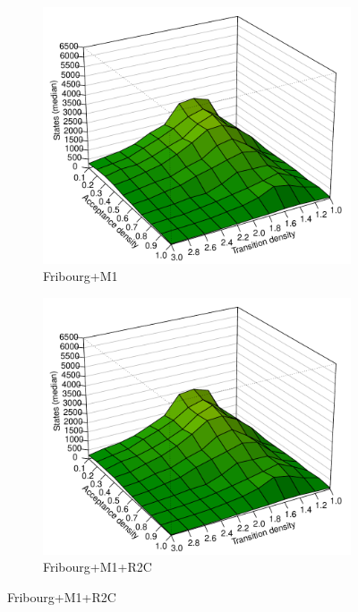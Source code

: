 \begin{figure}[ht]
\centering
  \hfill
  \begin{subfigure}[t]{\perspwidth\textwidth}
  \centering
  \includegraphics[width=\textwidth]{figures/r/internal/goal/s.median.Fribourg+M1.pdf}
  \caption{Fribourg+M1}
  \end{subfigure}
  \hfill
  \begin{subfigure}[t]{\perspwidth\textwidth}
  \centering
  \includegraphics[width=\textwidth]{figures/r/internal/goal/s.median.Fribourg+M1+R2C.pdf}
  \caption{Fribourg+M1+R2C}
  \end{subfigure}
  \hfill


\end{figure}
